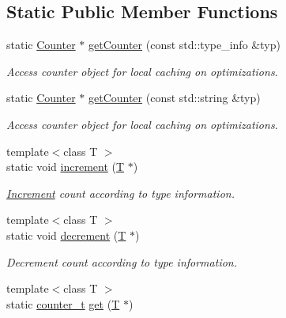 \subsection*{Static Public Member Functions}
\begin{DoxyCompactItemize}
\item 
static \hyperlink{class_d_d4hep_1_1_instance_count_1_1_counter}{Counter} $\ast$ \hyperlink{struct_d_d4hep_1_1_instance_count_a439db48975fe6b4e193a7ff40bc96bc6}{get\+Counter} (const std\+::type\+\_\+info \&typ)
\begin{DoxyCompactList}\small\item\em Access counter object for local caching on optimizations. \end{DoxyCompactList}\item 
static \hyperlink{class_d_d4hep_1_1_instance_count_1_1_counter}{Counter} $\ast$ \hyperlink{struct_d_d4hep_1_1_instance_count_ace5ceb5f2e95cb4c2a48cbd9edc3e84c}{get\+Counter} (const std\+::string \&typ)
\begin{DoxyCompactList}\small\item\em Access counter object for local caching on optimizations. \end{DoxyCompactList}\item 
{\footnotesize template$<$class T $>$ }\\static void \hyperlink{struct_d_d4hep_1_1_instance_count_aaaf8d46a477863acc69b65afbab96b22}{increment} (\hyperlink{class_t}{T} $\ast$)
\begin{DoxyCompactList}\small\item\em \hyperlink{struct_d_d4hep_1_1_increment}{Increment} count according to type information. \end{DoxyCompactList}\item 
{\footnotesize template$<$class T $>$ }\\static void \hyperlink{struct_d_d4hep_1_1_instance_count_a5053617b5c5083ea3b7d8f306c9a3933}{decrement} (\hyperlink{class_t}{T} $\ast$)
\begin{DoxyCompactList}\small\item\em Decrement count according to type information. \end{DoxyCompactList}\item 
{\footnotesize template$<$class T $>$ }\\static \hyperlink{struct_d_d4hep_1_1_instance_count_ae81dc0c76b135425e14b6dc38262a727}{counter\+\_\+t} \hyperlink{struct_d_d4hep_1_1_instance_count_a072aeb0f2392224316c4aac3433f0068}{get} (\hyperlink{class_t}{T} $\ast$)

\end{DoxyCompactItemize}
